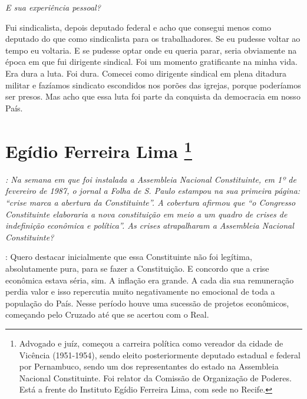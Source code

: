 \medskip

\noindent\emph{E sua experiência pessoal?}

Fui sindicalista, depois deputado federal e acho
que consegui menos como deputado do que como sindicalista para os
trabalhadores. Se eu pudesse voltar ao tempo eu voltaria. E se pudesse
optar onde eu queria parar, seria obviamente na época em que fui
dirigente sindical. Foi um momento gratificante na minha vida. Era dura
a luta. Foi dura. Comecei como dirigente sindical em plena ditadura
militar e fazíamos sindicato escondidos nos porões das igrejas, porque
poderíamos ser presos. Mas acho que essa luta foi parte da conquista da
democracia em nosso País.

\chapter{Egídio Ferreira Lima
\footnote{Advogado e juíz, começou a carreira política como vereador da cidade de
Vicência (1951-1954), sendo eleito posteriormente deputado estadual e
federal por Pernambuco, sendo um dos representantes do estado na
Assembleia Nacional Constituinte. Foi relator da Comissão de Organização
de Poderes. Está a frente do Instituto Egídio Ferreira Lima, com sede no
Recife.}}

\emph{: Na semana em que foi instalada a Assembleia Nacional
Constituinte, em 1º de fevereiro de 1987, o jornal a Folha de S. Paulo
estampou na sua primeira página: ``crise marca a abertura da
Constituinte''. A cobertura afirmou que ``o Congresso Constituinte
elaboraria a nova constituição em meio a um quadro de crises de
indefinição econômica e política''. As crises atrapalharam a Assembleia
Nacional Constituinte?}

: Quero destacar inicialmente que essa Constituinte não
foi legítima, absolutamente pura, para se fazer a Constituição. E
concordo que a crise econômica estava séria, sim. A inflação era grande.
A cada dia sua remuneração perdia valor e isso repercutia muito
negativamente no emocional de toda a população do País. Nesse período
houve uma sucessão de projetos econômicos, começando pelo Cruzado até
que se acertou com o Real.

